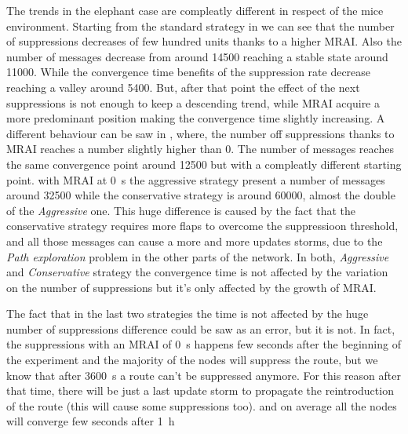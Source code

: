 The trends in the elephant case are compleatly different in respect of the
mice environment.
Starting from the standard strategy in 
we can see that the number of suppressions decreases of few hundred units
thanks to a higher \ac{MRAI}.
Also the number of messages decrease from around \num{14500} reaching a stable
state around \num{11000}.
While the convergence time benefits of the suppression rate decrease reaching 
a valley around \num{5400}{\second}. 
But, after that point the effect of the next suppressions is not enough to keep
a descending trend, while \ac{MRAI} acquire a more predominant position making
the convergence time slightly increasing.
A different behaviour can be saw in 
,
where, the number off suppressions thanks to \ac{MRAI} reaches a number slightly
higher than \num{0}.
The number of messages reaches the same convergence point around \num{12500} but
with a compleatly different starting point.
with \ac{MRAI} at \SI{0}{\second} the aggressive strategy present a number of 
messages around \num{32500} while the conservative strategy is around \num{60000},
almost the double of the \textit{Aggressive} one.
This huge difference is caused by the fact that the conservative strategy requires
more flaps to overcome the suppressioon threshold, and all those messages can 
cause a more and more updates storms, due to the \textit{Path exploration} problem
in the other parts of the network.
In both, \textit{Aggressive} and \textit{Conservative} strategy the convergence
time is not affected by the variation on the number of suppressions but it's only
affected by the growth of \ac{MRAI}.

The fact that in the last two strategies the time is not affected by the huge number
of suppressions difference could be saw as an error, but it is not.
In fact, the suppressions with an \ac{MRAI} of \SI{0}{\second} happens
few seconds after the beginning of the experiment and the majority of the nodes
will suppress the route, but we know that after \SI{3600}{\second} a route 
can't be suppressed anymore.
For this reason after that time, there will be just a last update storm to propagate
the reintroduction of the route (this will cause some suppressions too).
and on average all the nodes will converge few seconds after \SI{1}{\hour}

